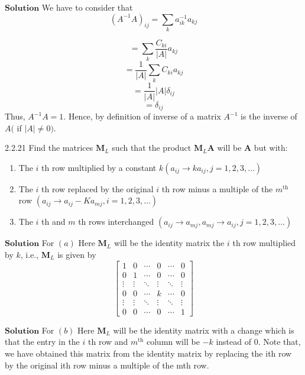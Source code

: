 \documentclass{styles/kaobook}
\begin{document}
$\boxed{\textbf{Solution}}$ We have to consider that
$$
\left(A^{-1} A\right)_{i j}=\sum_{k} a_{i k}^{-1} a_{k j}
$$

$$=\sum_{k} \frac{C_{k i}}{|A|} a_{k j}$$
$$=\frac{1}{|A|} \sum_{k} C_{k i} a_{k j}$$
$$=\frac{1}{|A|}|A| \delta_{i j}$$
$$=\delta_{i j}$$
Thus, $A^{-1} A=1$. Hence, by definition of inverse of a matrix $A^{-1}$ is the inverse of $A($ if $|A| \neq 0)$. 









\begin{greenbox}{2.2.21}
Find the matrices $\mathbf{M}_{L}$ such that the product $\mathbf{M}_{L} \mathbf{A}$ will be $\mathbf{A}$ but with:
\begin{enumerate}[$(a)$]
\item The $i$ th row multiplied by a constant $k\left(a_{i j} \rightarrow k a_{i j}, j=1,2,3, \ldots\right)$
\item The $i$ th row replaced by the original $i$ th row minus a multiple of the $m^{\text{th}}$ row
$\left(a_{i j} \rightarrow a_{i j}-K a_{m j}, i=1,2,3, \ldots\right)$
\item The $i$ th and $m$ th rows interchanged $\left(a_{i j} \rightarrow a_{m j}, a_{m j} \rightarrow a_{i j}, j=1,2,3, \ldots\right)$

\end{enumerate}
\end{greenbox}

$\boxed{\textbf{Solution}}$  For $(a)$ Here $\mathbf{M}_{L}$ will be the identity matrix the $i$ th row multiplied by $k$, i.e., $\mathbf{M}_{L}$ is given by
$$\begin{bmatrix}{1} & {0} & {\cdots} & {0} & {\cdots} & {0} \\ {0} & {1} & {\cdots} & {0} & {\cdots} & {0} \\ {\vdots} & {\vdots} & {\ddots} & {\vdots} & {\ddots} & {\vdots} \\ {0} & {0} & {\cdots} & {k} & {\cdots} & {0} \\ {\vdots} & {\vdots} & {\ddots} & {\vdots} & {\ddots} & {\vdots} \\ {0} & {0} & {\cdots} & {0} & {\cdots} & {1}\end{bmatrix}$$

$\boxed{\textbf{Solution}}$ For $(b)$ Here $\mathbf{M}_{L}$ will be the identity matrix with a change which is that the entry in the $i$ th row and $m^{\text{th}}$ column will be $-k$ instead of $0$. Note that, we have obtained this matrix from the identity matrix by replacing the ith row by the original ith row minus a multiple of the mth row.
\end{document}
